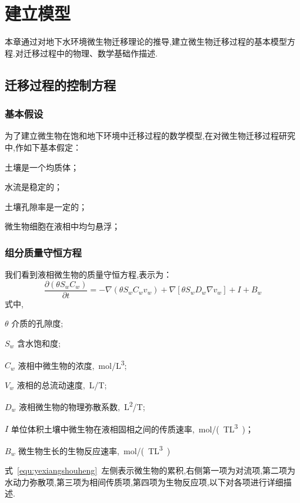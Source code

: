 \chapter{建立模型}
本章通过对地下水环境微生物迁移理论的推导,建立微生物迁移过程的基本模型方程.对迁移过程中的物理、数学基础作描述.
\section{迁移过程的控制方程}
\subsection{基本假设}
为了建立微生物在饱和地下环境中迁移过程的数学模型,在对微生物迁移过程研究中,作如下基本假定：
\begin{asparaenum}[(1)]
\item 土壤是一个均质体； 
\item 水流是稳定的； 
\item 土壤孔隙率是一定的； 
\item 微生物细胞在液相中均匀悬浮； 
\end{asparaenum}\par
\subsection{组分质量守恒方程}
我们看到液相微生物的质量守恒方程,表示为：
\begin{equation}\label{equ:yexiangshouheng}
\dfrac{\partial(\theta S_w C_w)}{\partial t}
=-\nabla(\theta S_w C_w v_w)+\nabla[\theta S_wD_w\nabla v_w]+I+B_w
\end{equation}
式中,
\begin{asparadesc}
	\item[$\theta$]介质的孔隙度;
	\item[$S_w$]含水饱和度;
	\item[$C_w$]液相中微生物的浓度,\SI{}{mol/L^3};
	\item[$V_w$]液相的总流动速度,\SI{}{L/T};
	\item[$D_w$]液相微生物的物理弥散系数,\SI{}{L^2/T};
	\item[$I$]单位体积土壤中微生物在液相固相之间的传质速率,\SI{}{mol/(TL^3)}；
	\item[$B_w$]微生物生长的生物反应速率,\SI{}{mol/(TL^3)}
\end{asparadesc}
式~\eqref{equ:yexiangshouheng}~左侧表示微生物的累积,右侧第一项为对流项,第二项为水动力弥散项,第三项为相间传质项,第四项为生物反应项,以下对各项进行详细描述.
